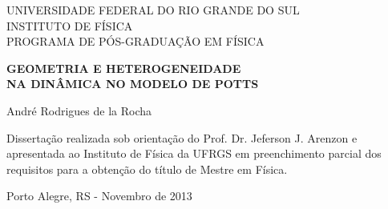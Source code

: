 \begin{titlepage}
 
\begin{center}

 UNIVERSIDADE FEDERAL DO RIO GRANDE DO SUL \\
 INSTITUTO DE FÍSICA \\
 PROGRAMA DE PÓS-GRADUAÇÃO EM FÍSICA \\

 \vspace{3cm}
 \begin{spacing}{1.5}
	\begin{LARGE}\textbf{GEOMETRIA E HETEROGENEIDADE \\ 
                         NA DINÂMICA NO MODELO DE POTTS \\}
	\end{LARGE}
 \end{spacing}

 \vspace{2cm}
 \begin{Large}André Rodrigues de la Rocha \end{Large}

\end{center}


\vspace{3.5cm}
\hspace{7cm}
\begin{minipage}{7.5cm}
\noindent Dissertação realizada sob orientação do Prof. Dr. Jeferson J. Arenzon e apresentada ao Instituto de Física da UFRGS em preenchimento parcial dos requisitos para a obtenção do título de Mestre em Física.
\end{minipage}

\vspace{3.5cm}
\begin{center}
 Porto Alegre, RS - Novembro de 2013
\end{center}


\end{titlepage} 

